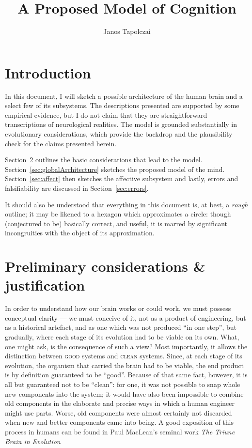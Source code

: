 \documentclass[]{scrartcl}
\title{{\huge A Proposed Model of Cognition}}
\author{Janos Tapolczai}
\newcommand{\caps}[1]{\textsc{#1}}
\begin{document}
\maketitle

\begin{abstract}

\end{abstract}

\tableofcontents
\newpage

\section{Introduction}

In this document, I will sketch a possible architecture of the human brain and a select few of its subsystems. The descriptions presented are supported by some empirical evidence, but I do not claim that they are straightforward transcriptions of neurological realities. The model is grounded substantially in evolutionary considerations, which provide the backdrop and the plausibility check for the claims presented herein.

Section~\ref{sec:preliminaries} outlines the basic considerations that lead to the model. Section~\ref{sec:globalArchitecture} sketches the proposed model of the mind. Section~\ref{sec:affect} then sketches the affective subsystem and lastly, errors and falsifiability are discussed in Section~\ref{sec:errors}. 

It should also be understood that everything in this document is, at best, a {\em rough} outline; it may be likened to a hexagon which approximates a circle: though (conjectured to be) basically correct, and useful, it is marred by significant incongruities with the object of its approximation.

\section{Preliminary considerations \& justification}\label{sec:preliminaries}

In order to understand how our brain works or could work, we must possess conceptual clarity --- we must conceive of it, not as a product of engineering, but as a historical artefact, and as one which was not produced ``in one step'', but gradually, where each stage of its evolution had to be viable on its own. What, one might ask, is the consequence of such a view?
Most importantly, it allows the distinction between \caps{good} systems and \caps{clean} systems. Since, at each stage of its evolution, the organism that carried the brain had to be viable, the end product is by definition guaranteed to be ``good''. Because of that same fact, however, it is all but guaranteed not to be ``clean'': for one, it was not possible to snap whole new components into the system; it would have also been impossible to combine old components in the elaborate and precise ways in which a human engineer might use parts. Worse, old components were almost certainly not discarded when new and better components came into being. A good exposition of this process in humans can be found in Paul MacLean's seminal work {\em The Triune Brain in Evolution} \cite{maclean1990}
\end{document}
